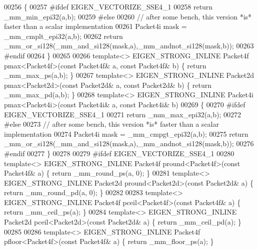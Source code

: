 \begin{DoxyCode}
00256 \{
00257 \textcolor{preprocessor}{#ifdef EIGEN\_VECTORIZE\_SSE4\_1}
00258   \textcolor{keywordflow}{return} \_mm\_min\_epi32(a,b);
00259 \textcolor{preprocessor}{#else}
00260   \textcolor{comment}{// after some bench, this version *is* faster than a scalar implementation}
00261   Packet4i mask = \_mm\_cmplt\_epi32(a,b);
00262   \textcolor{keywordflow}{return} \_mm\_or\_si128(\_mm\_and\_si128(mask,a),\_mm\_andnot\_si128(mask,b));
00263 \textcolor{preprocessor}{#endif}
00264 \}
00265 
00266 \textcolor{keyword}{template}<> EIGEN\_STRONG\_INLINE Packet4f pmax<Packet4f>(\textcolor{keyword}{const} Packet4f& a, \textcolor{keyword}{const} Packet4f& b) \{ \textcolor{keywordflow}{return} 
      \_mm\_max\_ps(a,b); \}
00267 \textcolor{keyword}{template}<> EIGEN\_STRONG\_INLINE Packet2d pmax<Packet2d>(\textcolor{keyword}{const} Packet2d& a, \textcolor{keyword}{const} Packet2d& b) \{ \textcolor{keywordflow}{return} 
      \_mm\_max\_pd(a,b); \}
00268 \textcolor{keyword}{template}<> EIGEN\_STRONG\_INLINE Packet4i pmax<Packet4i>(\textcolor{keyword}{const} Packet4i& a, \textcolor{keyword}{const} Packet4i& b)
00269 \{
00270 \textcolor{preprocessor}{#ifdef EIGEN\_VECTORIZE\_SSE4\_1}
00271   \textcolor{keywordflow}{return} \_mm\_max\_epi32(a,b);
00272 \textcolor{preprocessor}{#else}
00273   \textcolor{comment}{// after some bench, this version *is* faster than a scalar implementation}
00274   Packet4i mask = \_mm\_cmpgt\_epi32(a,b);
00275   \textcolor{keywordflow}{return} \_mm\_or\_si128(\_mm\_and\_si128(mask,a),\_mm\_andnot\_si128(mask,b));
00276 \textcolor{preprocessor}{#endif}
00277 \}
00278 
00279 \textcolor{preprocessor}{#ifdef EIGEN\_VECTORIZE\_SSE4\_1}
00280 \textcolor{keyword}{template}<> EIGEN\_STRONG\_INLINE Packet4f pround<Packet4f>(\textcolor{keyword}{const} Packet4f& a) \{ \textcolor{keywordflow}{return} \_mm\_round\_ps(a, 0); \}
00281 \textcolor{keyword}{template}<> EIGEN\_STRONG\_INLINE Packet2d pround<Packet2d>(\textcolor{keyword}{const} Packet2d& a) \{ \textcolor{keywordflow}{return} \_mm\_round\_pd(a, 0); \}
00282 
00283 \textcolor{keyword}{template}<> EIGEN\_STRONG\_INLINE Packet4f pceil<Packet4f>(\textcolor{keyword}{const} Packet4f& a) \{ \textcolor{keywordflow}{return} \_mm\_ceil\_ps(a); \}
00284 \textcolor{keyword}{template}<> EIGEN\_STRONG\_INLINE Packet2d pceil<Packet2d>(\textcolor{keyword}{const} Packet2d& a) \{ \textcolor{keywordflow}{return} \_mm\_ceil\_pd(a); \}
00285 
00286 \textcolor{keyword}{template}<> EIGEN\_STRONG\_INLINE Packet4f pfloor<Packet4f>(\textcolor{keyword}{const} Packet4f& a) \{ \textcolor{keywordflow}{return} \_mm\_floor\_ps(a); \}

\end{DoxyCode}
